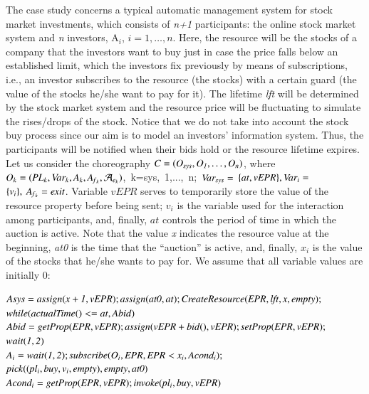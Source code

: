 The case study concerns a typical automatic management system for stock market investments, which consists of {\em n+1} participants:
the online stock market system and {\em n} investors, A$_i$, $i=1,\ldots, n$. Here, the resource will be the stocks of a company that the investors want to buy just in case the price falls below an established limit, which the investors fix previously by means of subscriptions, i.e., an investor subscribes to the resource (the stocks) with a certain guard (the value of the stocks he/she want to pay for it). The lifetime {\em lft} will be determined by the stock market system and the resource price will be fluctuating to simulate the rises/drops of the stock. Notice that we do not take into account the stock buy process since our aim is to model an investors' information system. Thus, the participants will be notified when their bids hold or the resource lifetime expires.  
Let us consider the choreography ${\it C=(O_{sys},O_1,\ldots,O_n)}$, where 
\mbox{${\it O_k=(PL_k,Var_k,A_k,A_{f{_k}},\mathcal{A}_{e{_k}})}$,~k=sys,~1,...,~n;}~\mbox{${\it Var_{sys}=}$} ${\it \{at,vEPR\}, Var_i=}$ \\ ${\it  \{v_i\},\ A_{f{_k}}= exit}$. Variable $v{EPR}$ serves to temporarily store the value of the resource property before being sent; $v_i$ is the variable used for the interaction among participants, and, finally, $at$ controls the period of time in which the auction is active. Note that the value {\em x} indicates the resource value at the beginning, {\em at0} is the time that the ``auction'' is active, and, finally, {\em $x_i$} is the value of the stocks that he/she wants to pay for. We assume that all variable values are initially $0$: 
\begin{flushleft}
\small{ 
${\it Asys=assign(x+1,vEPR);assign(at0,at);CreateResource(EPR,lft,x,empty);}$\\
\hspace{1.1cm}${\it  while(actualTime()<=at,Abid)}$\\
${\it Abid=getProp(EPR,vEPR);assign(vEPR+bid(),vEPR);setProp(EPR,vEPR);} $ \\ \hspace{1.1cm}${\it wait(1,2)}$\\
${\it A_i=wait(1,2);subscribe(O_i,EPR,EPR<x_i,Acond_i);} $ \\ \hspace{0.8cm}${\it pick((pl_i,buy,v_i,empty),empty,at0)}$\\
${\it Acond_i=getProp(EPR,vEPR);invoke(pl_i,buy,vEPR)}$\\
}
\end{flushleft}

